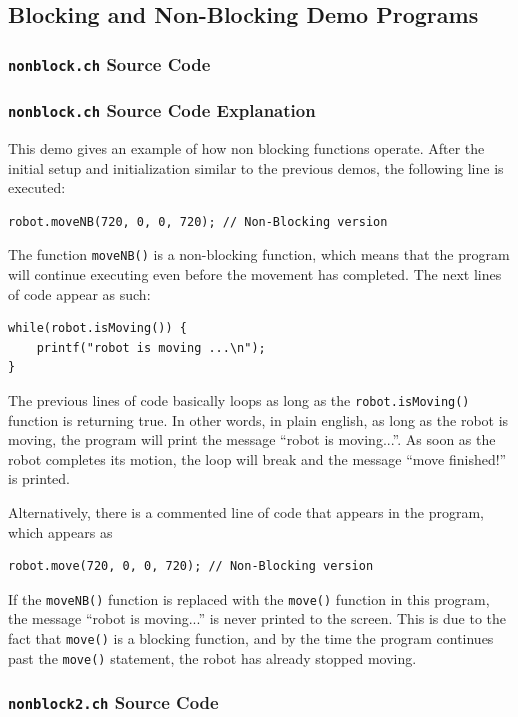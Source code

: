 \documentclass{article}
\begin{document}
\subsection{Blocking and Non-Blocking Demo Programs}
\subsubsection{\texttt{nonblock.ch} Source Code}

\subsubsection{\texttt{nonblock.ch} Source Code Explanation}
This demo gives an example of how non blocking functions operate. 
After the initial setup and initialization similar to the previous
demos, the following line is executed:
\begin{verbatim}
robot.moveNB(720, 0, 0, 720); // Non-Blocking version
\end{verbatim}
The function \texttt{moveNB()} is a non-blocking function, which means
that the program will continue executing even before the movement
has completed. The next lines of code appear as such:
\begin{verbatim}
while(robot.isMoving()) {
    printf("robot is moving ...\n");
}
\end{verbatim}
The previous lines of code basically loops as long as the \texttt{robot.isMoving()} function
is returning true. In other words, in plain english, as long as the robot is moving,
the program will print the message ``robot is moving...''. As soon as the robot completes
its motion, the loop will break and the message ``move finished!'' is printed.

Alternatively, there is a commented line of code that appears in the program, which
appears as
\begin{verbatim}
robot.move(720, 0, 0, 720); // Non-Blocking version
\end{verbatim}
If the \texttt{moveNB()} function is replaced with the \texttt{move()} function in this program,
the message ``robot is moving...'' is never printed to the screen. This is due to the
fact that \texttt{move()} is a blocking function, and by the time the program continues past
the \texttt{move()} statement, the robot has already stopped moving.

\subsubsection{\texttt{nonblock2.ch} Source Code}

\end{document}
